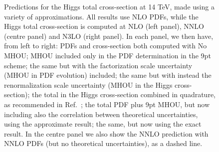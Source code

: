 \begin{figure}[h!]
    \begin{center}
    \end{center}
  \vspace{-0.55cm}
  \caption{Predictions for the Higgs total cross-section at 14 TeV, made using a variety of approximations. All results use NLO PDFs, while the Higgs total cross-section is computed at NLO (left panel), NNLO (centre panel) and N3LO (right panel). In each panel, we then have, from left to right: PDFs and cross-section both computed with No MHOU; MHOU included only in the PDF determination in the 9pt scheme; the same but with the factorization scale uncertainty (MHOU in PDF evolution) included; the same but with instead the renormalization scale uncertainty (MHOU in the Higgs cross-section); the total in the Higgs cross-section combined in quadrature, as recommended in Ref.~\cite{AbdulKhalek:2019ihb}; the total PDF plus 9pt MHOU, but now including also the correlation between theoretical uncertainties, using the approximate result; the same, but now using the exact result. In the centre panel we also show the NNLO prediction with NNLO PDFs (but no theoretical uncertainties), as a dashed line. }
  \label{fig:Higgs}
\end{figure}

